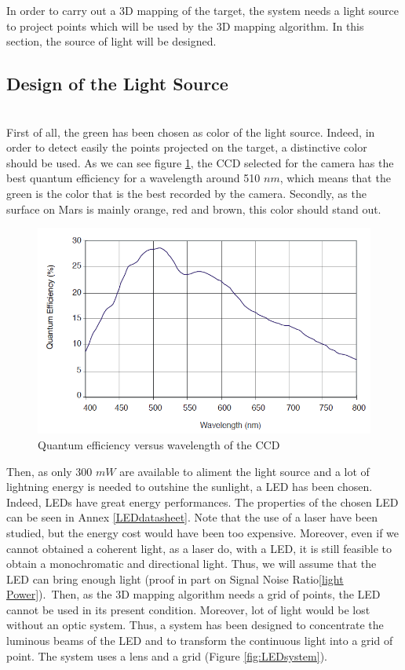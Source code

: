 In order to carry out a 3D mapping of the target, the system needs a light source to project points which will be used by the 3D mapping algorithm. In this section, the source of light will be designed.

\subsection{Design of the Light Source}
~\\
First of all, the green has been chosen as color of the light source. Indeed, in order to detect easily the points projected on the target, a distinctive color should be used. As we can see figure \ref{fig:QeCCD}, the CCD selected for the camera has the best quantum efficiency for a wavelength around 510 $nm$, which means that the green is the color that is the best recorded by the camera. Secondly, as the surface on Mars is mainly orange, red and brown, this color should stand out.


\begin{figure}[h]
  \centerline{\includegraphics[scale=0.6]{fig/QeCCD.png}}
  \caption{Quantum efficiency versus wavelength of the CCD}
  \label{fig:QeCCD}
\end{figure}

Then, as only 300 $mW$ are available to aliment the light source and a lot of lightning energy is needed to outshine the sunlight, a LED has been chosen. Indeed, LEDs have great energy performances. The properties of the chosen LED can be seen in Annex \ref{LEDdatasheet}. Note that the use of a laser have been studied, but the energy cost would have been too expensive. Moreover, even if we cannot obtained a coherent light, as a laser do, with a LED, it is still feasible to obtain a monochromatic and directional light. Thus, we will assume that the LED can bring enough light (proof in part on Signal Noise Ratio\ref{light Power}).\
Then, as the 3D mapping algorithm needs a grid of points, the LED cannot be used in its present condition. Moreover, lot of light would be lost without an optic system. Thus, a system has been designed to concentrate the luminous beams of the LED and to transform the continuous light into a grid of point. The system uses a lens and a grid (Figure \ref{fig:LEDsystem}). 

